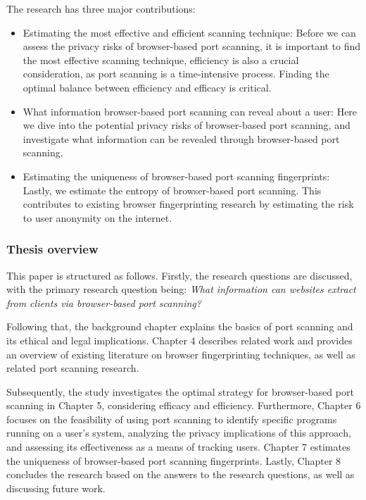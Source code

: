 The research has three major contributions:
\begin{itemize}
    \item Estimating the most effective and efficient scanning technique: Before we can assess the privacy risks of browser-based port scanning, it is important to find the most effective scanning technique, efficiency is also a crucial consideration, as port scanning is a time-intensive process. Finding the optimal balance between efficiency and efficacy is critical.
    \item What information browser-based port scanning can reveal about a user: Here we dive into the potential privacy risks of browser-based port scanning, and investigate what information can be revealed through browser-based port scanning.
    \item Estimating the uniqueness of browser-based port scanning fingerprints: Lastly, we estimate the entropy of browser-based port scanning. This contributes to existing browser fingerprinting research by estimating the risk to user anonymity on the internet. 
\end{itemize}

\subsubsection{Thesis overview}

This paper is structured as follows. Firstly, the research questions are discussed, with the primary research question being: \emph{What information can websites extract from clients via browser-based port scanning?} 

Following that, the background chapter explains the basics of port scanning and its ethical and legal implications. Chapter 4 describes related work and  provides an overview of existing literature on browser fingerprinting techniques, as well as related port scanning research.

Subsequently, the study investigates the optimal strategy for browser-based port scanning in Chapter 5, considering efficacy and efficiency. Furthermore, Chapter 6 focuses on the feasibility of using port scanning to identify specific programs running on a user's system, analyzing the privacy implications of this approach, and assessing its effectiveness as a means of tracking users. 
Chapter 7 estimates the uniqueness of browser-based port scanning fingerprints.
Lastly, Chapter 8 concludes the research based on the answers to the research questions, as well as discussing future work.